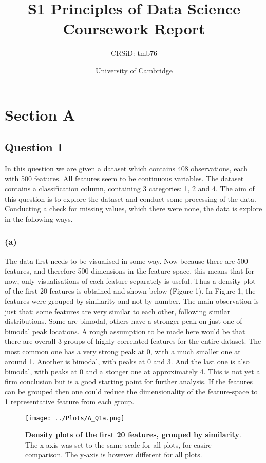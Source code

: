 \documentclass[12pt]{report} %
\title{S1 Principles of Data Science Coursework Report}
\author{CRSiD: tmb76}
\date{University of Cambridge}
\begin{document}
 

\maketitle

\chapter*{Section A}

\section*{Question 1}

In this question we are given a dataset which contains 408 observations, each with 500 features. All features seem to be continuous variables. The dataset contains a classification column, containing 3 categories: 1, 2 and 4. The aim of this question is to explore the dataset and conduct some processing of the data. Conducting a check for missing values, which there were none, the data is explore in the following ways.

\subsection*{(a)}

The data first needs to be visualised in some way. Now because there are 500 features, and therefore 500 dimensions in the feature-space, this means that for now, only visualisations of each feature separately is useful. Thus a density plot of the first 20 features is obtained and shown below (Figure 1). In Figure 1, the features were grouped by similarity and not by number. The main observation is just that: some features are very similar to each other, following similar distributions. Some are bimodal, others have a stronger peak on just one of bimodal peak locations. A rough assumption to be made here would be that there are overall 3 groups of highly correlated features for the entire dataset. The most common one has a very strong peak at 0, with a much smaller one at around 1. Another is bimodal, with peaks at 0 and 3. And the last one is also bimodal, with peaks at 0 and a stonger one at approximately 4. This is not yet a firm conclusion but is a good starting point for further analysis. If the features can be grouped then one could reduce the dimensionality of the feature-space to 1 representative feature from each group.

\begin{figure}[hp]
    \centering
    \texttt{[image: ../Plots/A\_Q1a.png]}
    \caption{ \textbf{Density plots of the first 20 features, grouped by similarity}. The x-axis was set to the same scale for all plots, for easire comparison. The y-axis is however different for all plots.}
\end{figure}
\end{document}
